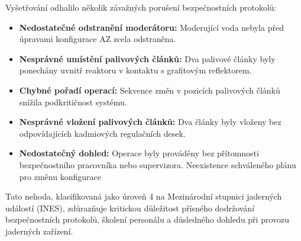 Vyšetřování odhalilo několik závažných porušení bezpečnostních protokolů:

\begin{itemize}
    \item \textbf{Nedostatečné odstranění moderátoru:} Moderující voda nebyla před úpravami konfigurace AZ zcela odstraněna.
    \item \textbf{Nesprávné umístění palivových článků:} Dva palivové články byly ponechány uvnitř reaktoru v kontaktu s grafitovým reflektorem.
    \item \textbf{Chybné pořadí operací:} Sekvence změn v pozicích palivových článků snížila podkritičnost systému.
    \item \textbf{Nesprávné vložení palivových článků:} Dva články byly vloženy bez odpovídajících kadmiových regulačních desek.
    \item \textbf{Nedostatečný dohled:} Operace byly prováděny bez přítomnosti bezpečnostního pracovníka nebo supervizora. Neexistence schváleného plánu pro změnu konfigurace
\end{itemize}

Tato nehoda, klasifikovaná jako úroveň 4 na Mezinárodní stupnici jaderných událostí (INES), zdůrazňuje kritickou důležitost přísného dodržování bezpečnostních protokolů, školení personálu a důsledného dohledu při provozu jaderných zařízení.


